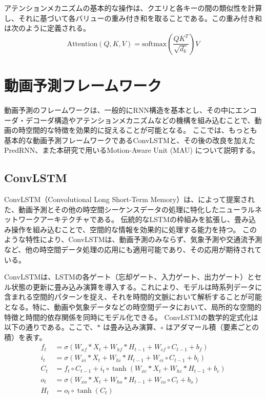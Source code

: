     アテンションメカニズムの基本的な操作は、クエリと各キーの間の類似性を計算し、それに基づいて各バリューの重み付き和を取ることである。この重み付き和は次のように定義される。
    \begin{equation}
      \text{Attention}(Q, K, V) = \text{softmax}\left(\frac{QK^T}{\sqrt{d_k}}\right)V
    \end{equation}

  \section{動画予測フレームワーク}
    動画予測のフレームワークは、一般的にRNN構造を基本とし、その中にエンコーダ・デコーダ構造やアテンションメカニズムなどの機構を組み込むことで、動画の時空間的な特徴を効果的に捉えることが可能となる。
    ここでは、もっとも基本的な動画予測フレームワークであるConvLSTMと、その後の改良を加えたPredRNN、また本研究で用いるMotion-Aware Unit (MAU) について説明する。

    \subsection{ConvLSTM}
      ConvLSTM（Convolutional Long Short-Term Memory）は、によって提案された、動画予測とその他の時空間シーケンスデータの処理に特化したニューラルネットワークアーキテクチャである。
      伝統的なLSTMの枠組みを拡張し、畳み込み操作を組み込むことで、空間的な情報を効果的に処理する能力を持つ。
      このような特性により、ConvLSTMは、動画予測のみならず、気象予測や交通流予測など、他の時空間データ処理の応用にも適用可能であり、その応用が期待されている。

      ConvLSTMは、LSTMの各ゲート（忘却ゲート、入力ゲート、出力ゲート）とセル状態の更新に畳み込み演算を導入する。これにより、モデルは時系列データに含まれる空間的パターンを捉え、それを時間的文脈において解析することが可能となる。特に、動画や気象データなどの時空間データにおいて、局所的な空間的特徴と時間的依存関係を同時にモデル化できる。
      ConvLSTMの数学的定式化は以下の通りである。ここで、\( \ast \) は畳み込み演算、\( \circ \) はアダマール積（要素ごとの積）を表す。
      \begin{align}
        f_t &= \sigma(W_{xf} \ast X_t + W_{hf} \ast H_{t-1} + W_{cf} \circ C_{t-1} + b_f) \\
        i_t &= \sigma(W_{xi} \ast X_t + W_{hi} \ast H_{t-1} + W_{ci} \circ C_{t-1} + b_i) \\
        C_t &= f_t \circ C_{t-1} + i_t \circ \tanh(W_{xc} \ast X_t + W_{hc} \ast H_{t-1} + b_c) \\
        o_t &= \sigma(W_{xo} \ast X_t + W_{ho} \ast H_{t-1} + W_{co} \circ C_t + b_o) \\
        H_t &= o_t \circ \tanh(C_t)
      \end{align}

